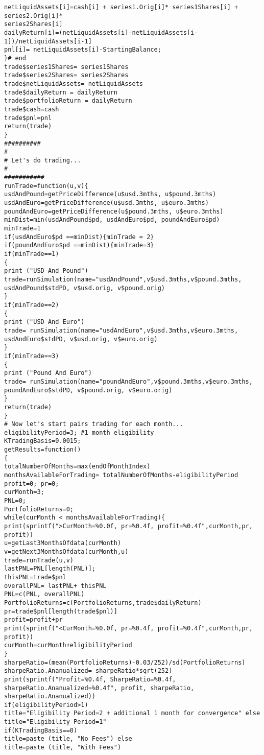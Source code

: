 \begin{small}
\begin{lstlisting}
netLiquidAssets[i]=cash[i] + series1.Orig[i]* series1Shares[i] + series2.Orig[i]* 
series2Shares[i]
dailyReturn[i]=(netLiquidAssets[i]-netLiquidAssets[i-1])/netLiquidAssets[i-1]
pnl[i]= netLiquidAssets[i]-StartingBalance;
}# end
trade$series1Shares= series1Shares
trade$series2Shares= series2Shares
trade$netLiquidAssets= netLiquidAssets
trade$dailyReturn = dailyReturn
trade$portfolioReturn = dailyReturn
trade$cash=cash
trade$pnl=pnl
return(trade)
}
##########
#
# Let's do trading...
#
###########
runTrade=function(u,v){
usdAndPound=getPriceDifference(u$usd.3mths, u$pound.3mths)
usdAndEuro=getPriceDifference(u$usd.3mths, u$euro.3mths)
poundAndEuro=getPriceDifference(u$pound.3mths, u$euro.3mths)
minDist=min(usdAndPound$pd, usdAndEuro$pd, poundAndEuro$pd)
minTrade=1
if(usdAndEuro$pd ==minDist){minTrade = 2}
if(poundAndEuro$pd ==minDist){minTrade=3}
if(minTrade==1)
{
print ("USD And Pound")
trade=runSimulation(name="usdAndPound",v$usd.3mths,v$pound.3mths, usdAndPound$stdPD, v$usd.orig, v$pound.orig)
}
if(minTrade==2)
{
print ("USD And Euro")
trade= runSimulation(name="usdAndEuro",v$usd.3mths,v$euro.3mths, usdAndEuro$stdPD, v$usd.orig, v$euro.orig)
}
if(minTrade==3)
{
print ("Pound And Euro")
trade= runSimulation(name="poundAndEuro",v$pound.3mths,v$euro.3mths, poundAndEuro$stdPD, v$pound.orig, v$euro.orig)
}
return(trade)
}
# Now let's start pairs trading for each month...
eligibilityPeriod=3; #1 month eligibility
KTradingBasis=0.0015;
getResults=function()
{
totalNumberOfMonths=max(endOfMonthIndex)
monthsAvailableForTrading= totalNumberOfMonths-eligibilityPeriod
profit=0; pr=0;
curMonth=3;
PNL=0;
PortfolioReturns=0;
while(curMonth < monthsAvailableForTrading){
print(sprintf(">CurMonth=%0.0f, pr=%0.4f, profit=%0.4f",curMonth,pr, profit))
u=getLast3MonthsOfdata(curMonth)
v=getNext3MonthsOfdata(curMonth,u)
trade=runTrade(u,v)
lastPNL=PNL[length(PNL)];
thisPNL=trade$pnl
overallPNL= lastPNL+ thisPNL
PNL=c(PNL, overallPNL)
PortfolioReturns=c(PortfolioReturns,trade$dailyReturn)
pr=trade$pnl[length(trade$pnl)]
profit=profit+pr
print(sprintf("<CurMonth=%0.0f, pr=%0.4f, profit=%0.4f",curMonth,pr, profit))
curMonth=curMonth+eligibilityPeriod
}
sharpeRatio=(mean(PortfolioReturns)-0.03/252)/sd(PortfolioReturns)
sharpeRatio.Ananualized= sharpeRatio*sqrt(252)
print(sprintf("Profit=%0.4f, SharpeRatio=%0.4f, sharpeRatio.Ananualized=%0.4f", profit, sharpeRatio, sharpeRatio.Ananualized))
if(eligibilityPeriod>1)
title="Eligibility Period=2 + additional 1 month for convergence" else
title="Eligibility Period=1"
if(KTradingBasis==0)
title=paste (title, "No Fees") else
title=paste (title, "With Fees")

\end{lstlisting}
\end{small}
